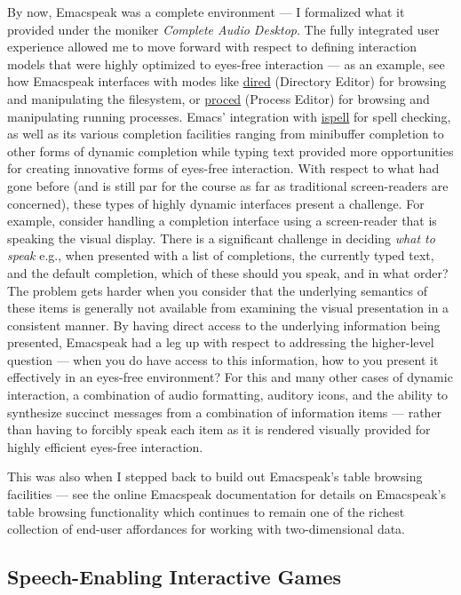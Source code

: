 \documentclass[11pt]{article}
\begin{document}
By now, Emacspeak was a complete environment — I formalized what
it provided under the moniker \emph{Complete Audio Desktop}. The fully
integrated user experience allowed me to move forward with
respect to defining interaction models that were highly optimized
to eyes-free interaction — as an example, see how Emacspeak
interfaces with modes like \uline{dired} (Directory Editor) for
browsing and manipulating the filesystem, or \uline{proced} (Process
Editor) for browsing and manipulating running processes. Emacs'
integration with \uline{ispell} for spell checking, as well as its
various completion facilities ranging from minibuffer completion
to other forms of dynamic completion while typing text provided
more opportunities for creating innovative forms of eyes-free
interaction. With respect to what had gone before (and is still
par for the course as far as traditional screen-readers are
concerned), these types of highly dynamic interfaces present a
challenge. For example, consider handling a completion interface
using a screen-reader that is speaking the visual display. There
is a significant challenge in deciding \emph{what to speak} e.g., when
presented with a list of completions, the currently typed text,
and the default completion, which of these should you speak, and
in what order? The problem gets harder when you consider that the
underlying semantics of these items is generally not available
from examining the visual presentation in a consistent manner. By
having direct access to the underlying information being
presented, Emacspeak had a leg up with respect to addressing the
higher-level question — when you do have access to this
information, how to you present it effectively in an eyes-free
environment? For this and many other cases of dynamic
interaction, a combination of audio formatting, auditory icons,
and the ability to synthesize succinct messages from a
combination of information items — rather than having to forcibly
speak each item as it is rendered visually provided for highly
efficient eyes-free interaction.


This was also when I stepped back to build out Emacspeak's table
browsing facilities — see the online Emacspeak documentation for
details on Emacspeak's table browsing functionality which
continues to remain one of the richest collection of end-user
affordances for working with two-dimensional data.

\subsection{Speech-Enabling Interactive Games}
\label{sec-9-1}
\end{document}
